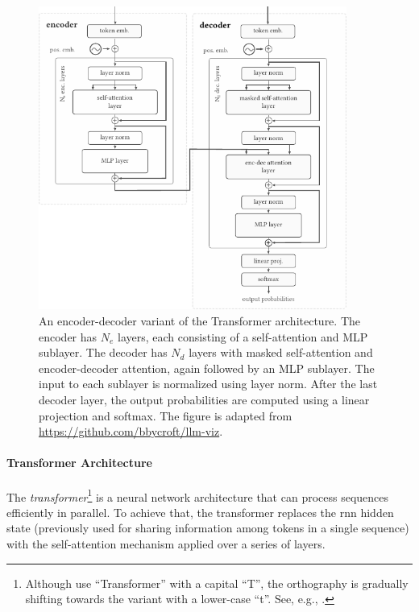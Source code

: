{\begin{figure}[ht]
    \centering
    \includegraphics[width=0.9\textwidth]{img/transformer.pdf}
    \caption{An encoder-decoder variant of the Transformer architecture. The encoder has $N_{e}$ layers, each consisting of a self-attention and MLP sublayer. The decoder has $N_{d}$ layers with masked self-attention and encoder-decoder attention, again followed by an MLP sublayer. The input to each sublayer is normalized using layer norm. After the last decoder layer, the output probabilities are computed using a linear projection and softmax. The figure is adapted from \href{https://github.com/bbycroft/llm-viz/blob/main/src/llm/intro-image.svg}{https://github.com/bbycroft/llm-viz}.}
    \label{fig:transformer}
\end{figure}


\paragraph{Transformer Architecture} The \emph{transformer}\footnote{Although \citet{vaswani2017attention} use ``Transformer'' with a capital ``T'', the orthography is gradually shifting towards the variant with a lower-case ``t''. See, e.g., \citet[p.~215]{jurafsky2024}.} \cite{vaswani2017attention} is a neural network architecture that can process sequences efficiently in parallel. To achieve that, the transformer replaces the \ac{rnn} hidden state (previously used for sharing information among tokens in a single sequence) with the self-attention mechanism applied over a series of layers.

}
